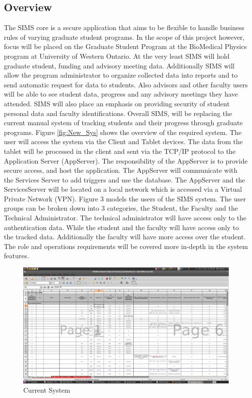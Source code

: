 \documentclass[11pt,a4paper]{report}
\begin{document}
\subsection{Overview}
The SIMS core is a secure application that aims to be flexible to handle business rules of varying graduate
student programs. In the scope of this project however, focus will be placed on the Graduate Student
Program at the BioMedical Physics program at University of Western Ontario. At the very least SIMS
will hold graduate student, funding and advisory meeting data. Additionally SIMS will allow the program
administrator to organize collected data into reports and to send automatic request for data to students.
Also advisors and other faculty users will be able to see student data, progress and any advisory meetings
they have attended. SIMS will also place an emphasis on providing security of student personal data and
faculty identifications. Overall SIMS, will be replacing the current manual system of tracking students and
their progress through graduate programs.
Figure \ref{fig:New_Sys} shows the overview of the required system. The user will access the system via the Client and
Tablet devices. The data from the tablet will be processed in the client and sent via the TCP/IP protocol
to the Application Server (AppServer). The responsibility of the AppServer is to provide secure access, and
host the application. The AppServer will communicate with the Services Server to add triggers and use the
database. The AppServer and the ServicesServer will be located on a local network which is accessed via
a Virtual Private Network (VPN). Figure 3 models the users of the SIMS system. The user groups can be
broken down into 3 categories, the Student, the Faculty and the Technical Administrator. The technical
administrator will have access only to the authentication data. While the student and the faculty will have
access only to the tracked data. Additionally the faculty will have more access over the student. The role
and operations requirements will be covered more in-depth in the system features.
\begin{figure}[htp]
\centering
\includegraphics[scale=0.25]{diagrams/Current_System.png}
\caption{Current System}
\label{fig:Curr_Sys}
\end{figure}
\end{document}
